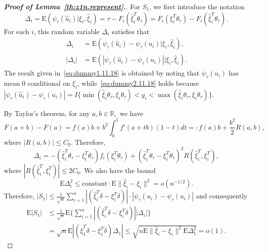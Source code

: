 \documentclass[times,sort&compress,3p]{elsarticle}
\theoremstyle{plain}%
\theoremstyle{definition}
\newcommand{\btheta}{{\theta}}
\newcommand{\const}{\text{constant} \cdot}
\newcommand{\bxi}{{\xi}}
\begin{document}
\begin{proof}[\textbf{\upshape Proof of Lemma~\ref{th:z1n.represent}.}]
For $S_1$, we first introduce the notation
\begin{equation}
	\label{eq:delta.def}
	\Delta_i  = \text{E}( \psi_{\tau}(\widehat{u}_i) | \bxi_{i}, \widehat{\bxi}_i) = \tau-F_i(\widehat{\bxi}_i^T \btheta_{\tau} )=F_i(\bxi_{i}^T \btheta_{\tau} )-F_i(\widehat{\bxi}_i^T \btheta_{\tau} ). 
\end{equation}
For each $i$, this random variable $\Delta_i$ satisfies that 
\begin{align}
	\label{eq:dummy1.11.18}
	\Delta_i & =  \text{E}( \psi_{\tau}(\widehat{u}_i) - \psi_{\tau}(u_i) | \bxi_{i}, \widehat{\bxi}_i), \\
	\label{eq:dummy2.11.18}
	|\Delta_i| & =  \text{E}( |\psi_{\tau}(\widehat{u}_i) - \psi_{\tau}(u_i)| | \bxi_{i}, \widehat{\bxi}_i).
\end{align}
The result given in~\eqref{eq:dummy1.11.18} is obtained by noting that $\psi_{\tau}(u_i)$ has mean 0 conditional on $\bxi_{i}$,  while~\eqref{eq:dummy2.11.18} holds because $|\psi_\tau(\widehat{u}_i) - \psi_\tau({u}_i)| = I\{\min(\widehat{\bxi}_i\btheta_{\tau},\bxi_{i}\btheta_{\tau})<y_i<\max(\widehat{\bxi}_i\btheta_{\tau} ,\bxi_{i}\btheta_{\tau}  )\}.$

By Taylor's theorem, for any $a, b \in \mathbb{R},$ we have
$$ F(a + b) - F(a) = f(a)b + b^2 \int_0^1 f'(a + tb)(1 - t) dt =: f(a)
b + \frac{ b^2}{2} R(a, b),$$
where $|R(a,b)| \leq C_0$. Therefore, 
\begin{equation}
	\Delta_i = -(\widehat{\bxi}_i^T \btheta_{\tau}  - \bxi_{i}^T \btheta_{\tau} ) f_i(\bxi_{i}^T \btheta_{\tau} ) + (\widehat{\bxi}_i^T \btheta_{\tau}  - \bxi_{i}^T \btheta_{\tau} )^2 R(\widehat{\bxi}_i^T, \bxi_{i}^T),
\end{equation}
where $|R(\widehat{\bxi}_i^T, \bxi_{i}^T)| \leq 2C_0$. We also have the bound 
\begin{equation}
	\text{E} \Delta_i^2 \leq \const \text{E} \|\widehat{\bxi}_i - \bxi_{i} \|^2  = o(n^{-1/2}).
\end{equation}
Therefore, $|S_1| 
\leq  \frac{1}{\sqrt{n}} \sum_{i = 1}^n |(\widehat{\bxi}_i^T {\delta} - \bxi_{i}^T {\delta})| \cdot  |\psi_\tau(\widehat{u}_i) - \psi_\tau({u}_i)|$ and consequently 
\begin{align}
	\text{E} |S_1| 
	& \leq \frac{1}{\sqrt{n}}\text{E} \{\sum_{i = 1}^n |(\widehat{\bxi}_i^T {\delta} - \bxi_{i}^T {\delta})| |\Delta_i| \} \\
	&= \sqrt{n} \text{E} |(\widehat{\bxi}_1^T {\delta} - \bxi_1^T {\delta}) \Delta_1| \leq \sqrt{n \text{E} \|\widehat{\bxi}_i - \bxi_{i} \|^2 \text{E} \Delta_1^2} = o(1). 
\end{align} 


\end{proof}
\end{document}

